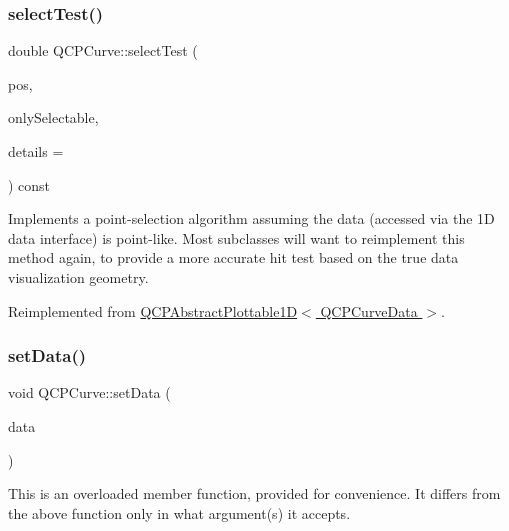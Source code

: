 \mbox{\label{class_q_c_p_curve_a0ed9b7e6b4bc72010d6fcd974af46a8b}} 
\subsubsection{\texorpdfstring{select\+Test()}{selectTest()}}
{\footnotesize\ttfamily double Q\+C\+P\+Curve\+::select\+Test (\begin{DoxyParamCaption}\item[{const Q\+PointF \&}]{pos,  }\item[{bool}]{only\+Selectable,  }\item[{Q\+Variant $\ast$}]{details = {} }\end{DoxyParamCaption}) const\hspace{0.3cm}{\ttfamily [virtual]}}

Implements a point-\/selection algorithm assuming the data (accessed via the 1D data interface) is point-\/like. Most subclasses will want to reimplement this method again, to provide a more accurate hit test based on the true data visualization geometry.

Reimplemented from \hyperlink{class_q_c_p_abstract_plottable1_d_a4611b43bcb6441b2154eb4f4e0a33db2}{Q\+C\+P\+Abstract\+Plottable1\+D$<$ Q\+C\+P\+Curve\+Data $>$}.

\mbox{\label{class_q_c_p_curve_a41246850d2e080bc57183ca19cd4135e}} 
\subsubsection{\texorpdfstring{set\+Data()}{setData()}\hspace{0.1cm}{\footnotesize\ttfamily [1/3]}}
{\footnotesize\ttfamily void Q\+C\+P\+Curve\+::set\+Data (\begin{DoxyParamCaption}\item[{Q\+Shared\+Pointer$<$ \hyperlink{qcustomplot_8h_aaeee80d5664ea91beb9d7968790d0e65}{Q\+C\+P\+Curve\+Data\+Container} $>$}]{data }\end{DoxyParamCaption})}

This is an overloaded member function, provided for convenience. It differs from the above function only in what argument(s) it accepts.

